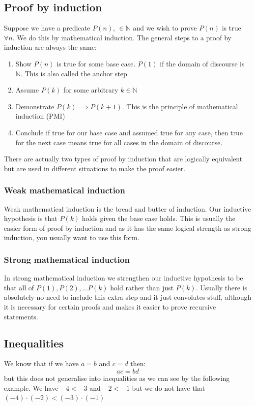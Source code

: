 \documentclass[12pt]{article}
\begin{document}
\subsection*{Proof by induction}
Suppose we have a predicate \(P(n),\,\in\mathbb{N}\) and we wish to prove \(P(n)\) is true \(\forall n\). We do this by mathematical induction. The general steps to a proof by induction are always the same:
\begin{enumerate}
    \item Show \(P(n)\) is true for some base case. \(P(1)\) if the domain of discourse is \(\mathbb{N}\). This is also called the anchor step
    \item Assume \(P(k)\) for some arbitrary \(k\in\mathbb{N}\)
    \item Demonstrate \(P(k)\implies P(k+1)\). This is the principle of mathematical induction (PMI)
    \item Conclude if true for our base case and assumed true for any case, then true for the next case means true for all cases in the domain of discourse.
\end{enumerate}
There are actually two types of proof by induction that are logically equivalent but are used in different situations to make the proof easier.
\subsubsection*{Weak mathematical induction}
Weak mathematical induction is the bread and butter of induction. Our inductive hypothesis is that \(P(k)\) holds given the base case holds. This is usually the easier form of proof by induction and as it has the same logical strength as strong induction, you usually want to use this form.
\subsubsection*{Strong mathematical induction}
In strong mathematical induction we strengthen our inductive hypothesis to be that all of \(P(1),P(2),...P(k)\) hold rather than just \(P(k)\). Usually there is absolutely no need to include this extra step and it just convolutes stuff, although it is necessary for certain proofs and makes it easier to prove recursive statements.
\subsection*{Inequalities}
We know that if we have \(a=b\) and \(c=d\) then:
\[ac=bd\]
but this does not generalise into inequalities as we can see by the following example. We have \(-4<-3\) and \(-2<-1\) but we do not have that \((-4)\cdot(-2)<(-3)\cdot(-1)\)
\end{document}
